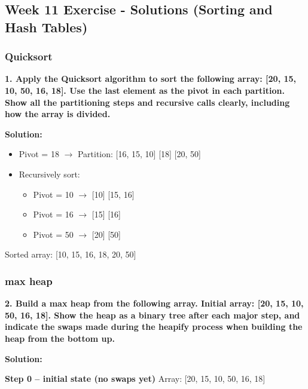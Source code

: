 
\subsection{Week 11 Exercise - Solutions (Sorting and Hash Tables)}

\subsubsection{Quicksort}
\textbf{1. Apply the Quicksort algorithm to sort the following array: [20, 15, 10, 50, 16, 18]. Use the last element as the pivot in each partition. Show all the partitioning steps and recursive calls clearly, including how the array is divided.}

\textbf{Solution:} 

\begin{itemize}
  \item Pivot = 18 $\rightarrow$ Partition: [16, 15, 10] [18] [20, 50] 
  \item Recursively sort:
  \begin{itemize}
    \item [16, 15, 10]   Pivot = 10 $\rightarrow$ [10] [15, 16] 
    \item [15, 16]   Pivot = 16 $\rightarrow$ [15] [16] 
    \item [20, 50]   Pivot = 50 $\rightarrow$ [20] [50] 
  \end{itemize}
\end{itemize}

Sorted array: [10, 15, 16, 18, 20, 50]
\subsubsection{max heap}
\textbf{2. Build a max heap from the following array. Initial array: [20, 15, 10, 50, 16, 18]. Show the heap as a binary tree after each major step, and indicate the swaps made during the heapify process when building the heap from the bottom up.}

\textbf{Solution:}

\textbf{Step 0 – initial state (no swaps yet)}
Array: [20, 15, 10, 50, 16, 18]
\begin{center}
\end{center}

